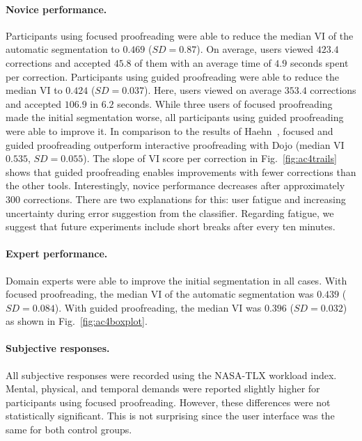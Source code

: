 \paragraph{Novice performance.} Participants using focused proofreading were able to reduce the median VI of the automatic segmentation to $0.469$ ($SD=0.87$). On average, users viewed $423.4$ corrections and accepted $45.8$ of them with an average time of $4.9$ seconds spent per correction. Participants using guided proofreading were able to reduce the median VI to $0.424$ ($SD=0.037$). Here, users viewed on average $353.4$ corrections and accepted $106.9$ in $6.2$ seconds. While three users of focused proofreading made the initial segmentation worse, all participants using guided proofreading were able to improve it. In comparison to the results of Haehn~\etal, focused and guided proofreading outperform interactive proofreading with Dojo (median VI $0.535$, $SD=0.055$). The slope of VI score per correction in Fig.~\ref{fig:ac4trails} shows that guided proofreading enables improvements with fewer corrections than the other tools. Interestingly, novice performance decreases after approximately $300$ corrections. There are two explanations for this: user fatigue and increasing uncertainty during error suggestion from the classifier. Regarding fatigue, we suggest that future experiments include short breaks after every ten minutes.

\paragraph{Expert performance.} Domain experts were able to improve the initial segmentation in all cases. With focused proofreading, the median VI of the automatic segmentation was $0.439$ ($SD=0.084$). With guided proofreading, the median VI was $0.396$ ($SD=0.032$) as shown in Fig.~\ref{fig:ac4boxplot}.

\paragraph{Subjective responses.} All subjective responses were recorded using the NASA-TLX workload index. Mental, physical, and temporal demands were reported slightly higher for participants using focused proofreading. However, these differences were not statistically significant. This is not surprising since the user interface was the same for both control groups.

